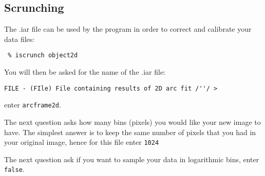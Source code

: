 \subsection{Scrunching}

The .iar file can be used by the 
 program in order to correct and calibrate your data files:

{\scspec{\small}{ }
\begin{verbatim}
 % iscrunch object2d
\end{verbatim}
}
You will then be asked for the name of the .iar file:
{\scspec{\small}{ }
\begin{verbatim}
FILE - (FIle) File containing results of 2D arc fit /''/ >
\end{verbatim}
}enter {\tt arcframe2d}.

The next question asks how many bins (pixels) you would like your new image to have. The simplest answer is to keep the same number of pixels that you had in your original image, hence for this file enter {\tt 1024}

The next question ask if you want to sample your data in logarithmic bins, enter {\tt false}.

